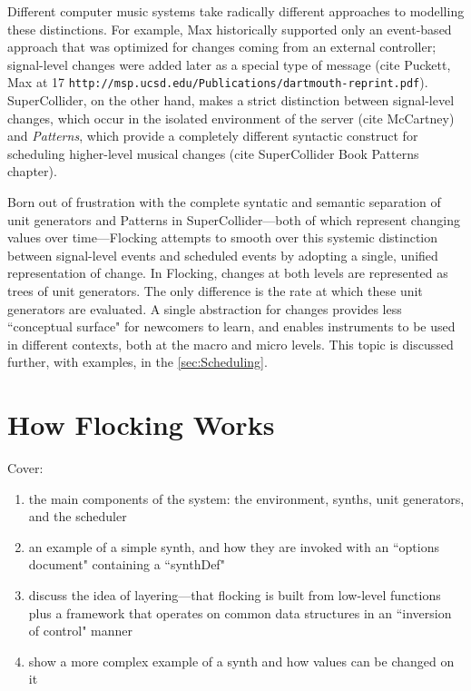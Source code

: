 \documentclass{article}
\begin{document}
Different computer music systems take radically different approaches to modelling these distinctions. For example, Max historically supported only an event-based approach that was optimized for changes coming from an external controller; signal-level changes were added later as a special type of message (cite Puckett, Max at 17 \verb|http://msp.ucsd.edu/Publications/dartmouth-reprint.pdf|). SuperCollider, on the other hand, makes a strict distinction between signal-level changes, which occur in the isolated environment of the server (cite McCartney) and {\it Patterns}, which provide a completely different syntactic construct for scheduling higher-level musical changes (cite SuperCollider Book Patterns chapter).

Born out of frustration with the complete syntatic and semantic separation of unit generators and Patterns in SuperCollider---both of which represent changing values over time---Flocking attempts to smooth over this systemic distinction between signal-level events and scheduled events by adopting a single, unified representation of change. In Flocking, changes at both levels are represented as trees of unit generators. The only difference is the rate at which these unit generators are evaluated. A single abstraction for changes provides less ``conceptual surface" for newcomers to learn, and enables instruments to be used in different contexts, both at the macro and micro levels. This topic is discussed further, with examples, in the \ref{sec:Scheduling}.

\section{How Flocking Works}

Cover:

\begin{enumerate}
\item the main components of the system: the environment, synths, unit generators, and the scheduler
\item an example of a simple synth, and how they are invoked with an ``options document" containing a ``synthDef"
\item discuss the idea of layering---that flocking is built from low-level functions plus a framework that operates on common data structures in an ``inversion of control" manner
\item show a more complex example of a synth and how values can be changed on it
\end{enumerate}
\end{document}
